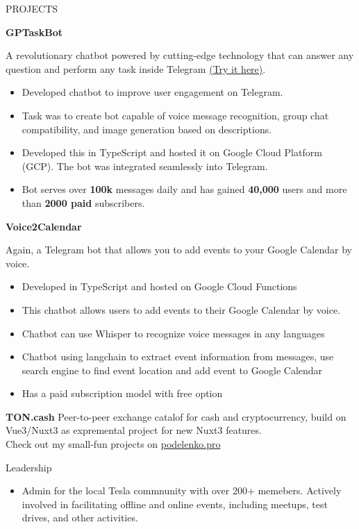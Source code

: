 \documentclass{template} %
\begin{document}
\begin{rSection}{PROJECTS}
\vspace{-1.25em}
\item \textbf{GPTaskBot} {A revolutionary chatbot powered by cutting-edge technology that can answer any question and perform any task inside Telegram \href{https://gptask.io/}{(Try it here)}.
    \begin{itemize}
        \itemsep -3pt {} 
        \item Developed chatbot to improve user engagement on Telegram.
        \item Task was to create bot capable of voice message recognition, group chat
compatibility, and image generation based on descriptions.
        \item Developed this in TypeScript and hosted it on Google Cloud Platform (GCP). The bot was integrated seamlessly into Telegram.
        \item Bot serves over \textbf{100k} messages daily and has gained \textbf{40,000} users and more than \textbf{2000 paid} subscribers.
    \end{itemize}
}
\item \textbf{Voice2Calendar} {Again, a Telegram bot that allows you to add events to your Google Calendar by voice.
    \begin{itemize}
        \itemsep -3pt {} 
        \item Developed in TypeScript and hosted on Google Cloud Functions
        \item This chatbot allows users to add events to their Google Calendar by voice.
        \item Chatbot can use Whisper to recognize voice messages in any languages
        \item Chatbot using langchain to extract event information from messages, use search engine to find event location and add event to Google Calendar
        \item Has a paid subscription model with free option
    \end{itemize}
}
\item \textbf{TON.cash} {Peer-to-peer exchange catalof for cash and cryptocurrency, build on Vue3/Nuxt3 as expremental project for new Nuxt3 features.}\\ 
Check out my small-fun projects on \href{https://podelenko.pro/#fun}{podelenko.pro}
\end{rSection} 


\begin{rSection}{Leadership} 
\begin{itemize}
    \item Admin for the local Tesla commnunity with over 200+ memebers. Actively involved in facilitating offline and online events, including meetups, test drives, and other activities.
\end{itemize}


\end{rSection}
\end{document}
